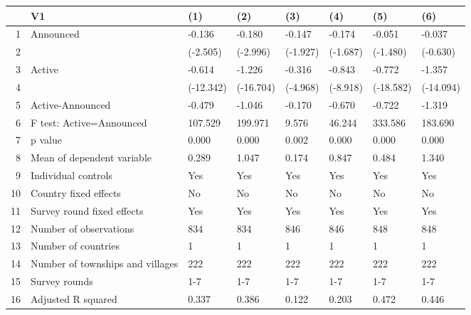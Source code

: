 \begin{table}[ht]
\centering
\begin{tabular}{rlllllll}
  \hline
 & V1 & (1) & (2) & (3) & (4) & (5) & (6) \\ 
  \hline
1 & Announced & -0.136 & -0.180 & -0.147 & -0.174 & -0.051 & -0.037 \\ 
  2 &  & (-2.505) & (-2.996) & (-1.927) & (-1.687) & (-1.480) & (-0.630) \\ 
  3 & Active & -0.614 & -1.226 & -0.316 & -0.843 & -0.772 & -1.357 \\ 
  4 &  & (-12.342) & (-16.704) & (-4.968) & (-8.918) & (-18.582) & (-14.094) \\ 
  5 & Active-Announced & -0.479 & -1.046 & -0.170 & -0.670 & -0.722 & -1.319 \\ 
  6 & F test: Active=Announced & 107.529 & 199.971 & 9.576 & 46.244 & 333.586 & 183.690 \\ 
  7 & p value & 0.000 & 0.000 & 0.002 & 0.000 & 0.000 & 0.000 \\ 
  8 & Mean of dependent variable & 0.289 & 1.047 & 0.174 & 0.847 & 0.484 & 1.340 \\ 
  9 & Individual controls & Yes & Yes & Yes & Yes & Yes & Yes \\ 
  10 & Country fixed effects & No & No & No & No & No & No \\ 
  11 & Survey round fixed effects & Yes & Yes & Yes & Yes & Yes & Yes \\ 
  12 & Number of observations & 834 & 834 & 846 & 846 & 848 & 848 \\ 
  13 & Number of countries & 1 & 1 & 1 & 1 & 1 & 1 \\ 
  14 & Number of townships and villages & 222 & 222 & 222 & 222 & 222 & 222 \\ 
  15 & Survey rounds & 1-7 & 1-7 & 1-7 & 1-7 & 1-7 & 1-7 \\ 
  16 & Adjusted R squared & 0.337 & 0.386 & 0.122 & 0.203 & 0.472 & 0.446 \\ 
   \hline
\end{tabular}
\end{table}
